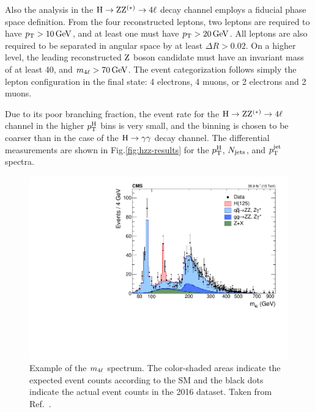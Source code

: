 Also the analysis in the $\mathrm{H}\to\mathrm{Z}\mathrm{Z}^{(\ast)}\to 4\ell$ decay channel employs a fiducial phase space definition.
% 
From the four reconstructed leptons, two leptons are required to have $p_\mathrm{T} > 10\,\text{GeV}$, and at least one must have $p_\mathrm{T} > 20\,\text{GeV}$.
% 
All leptons are also required to be separated in angular space by at least $\Delta R > 0.02$.
% 
On a higher level, the leading reconstructed $\mathrm{Z}$ boson candidate must have an invariant mass of at least 40\GeV, and $m_{4\ell} > 70\,\text{GeV}$.
% 
The event categorization follows simply the lepton configuration in the final state: 4 electrons, 4 muons, or 2 electrons and 2 muons.


Due to its poor branching fraction, the event rate for the $\mathrm{H}\to\mathrm{Z}\mathrm{Z}^{(\ast)}\to 4\ell$ channel in the higher $p_\mathrm{T}^\mathrm{H}$ bins is very small, and the binning is chosen to be coarser than in the case of the $\mathrm{H}\to\mathrm{\gamma}\mathrm{\gamma}$ decay channel.
% 
The differential measurements are shown in Fig.\ref{fig:hzz-results} for the $p_\mathrm{T}^\mathrm{H}$, $N_\text{jets} $, and $p_\mathrm{T}^\text{jet} $ spectra.



\begin{figure}[hbtp]
  \begin{center}
    \includegraphics[width=0.7\linewidth]{img/inputs/hzz/m4lspectrum.pdf}
    \caption{
        Example of the $m_{4\ell}$ spectrum.
        The color-shaded areas indicate the expected event counts according to the SM and the black dots indicate the actual event counts in the 2016 dataset.
        Taken from Ref.~\cite{Sirunyan:2017exp}.
        }
    \label{fig:example_mfourl}
  \end{center}
\end{figure}

